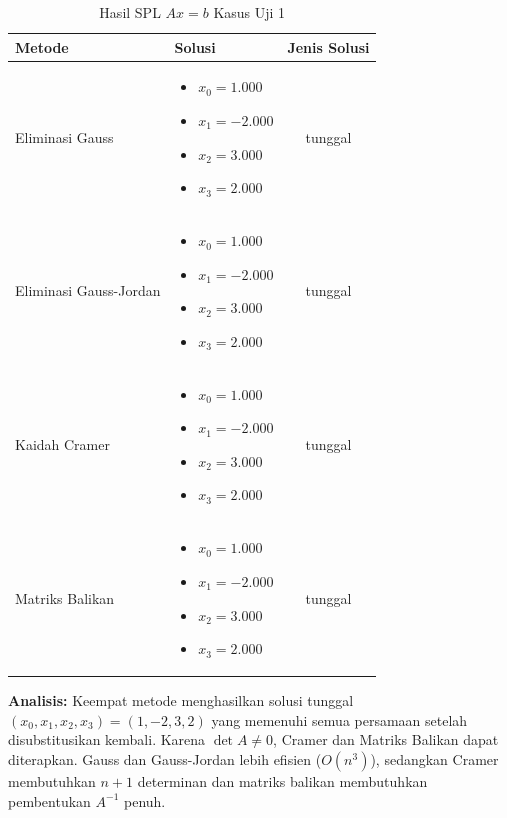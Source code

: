 \documentclass[12pt,a4paper]{report}
\begin{document}
\begin{table}[H]
    \centering
    \caption{Hasil SPL $Ax=b$ Kasus Uji 1}
    \begin{tabular}{|l|p{5cm}|c|}
        \hline
        \textbf{Metode} & \textbf{Solusi} & \textbf{Jenis Solusi} \\
        \hline
        Eliminasi Gauss & 
        \begin{itemize}
            \item $x_0 = 1.000$
            \item $x_1 = -2.000$
            \item $x_2 = 3.000$
            \item $x_3 = 2.000$
        \end{itemize} 
        & tunggal\\
        \hline
        Eliminasi Gauss-Jordan & 
        \begin{itemize}
            \item $x_0 = 1.000$
            \item $x_1 = -2.000$
            \item $x_2 = 3.000$
            \item $x_3 = 2.000$
        \end{itemize} 
        & tunggal \\
        \hline
        Kaidah Cramer & 
        \begin{itemize}
            \item $x_0 = 1.000$
            \item $x_1 = -2.000$
            \item $x_2 = 3.000$
            \item $x_3 = 2.000$
        \end{itemize} 
        & tunggal \\
        \hline
        Matriks Balikan & 
        \begin{itemize}
            \item $x_0 = 1.000$
            \item $x_1 = -2.000$
            \item $x_2 = 3.000$
            \item $x_3 = 2.000$
        \end{itemize} 
        & tunggal \\
        \hline
    \end{tabular}
\end{table}

 
\textbf{Analisis:} Keempat metode menghasilkan solusi tunggal $(x_0,x_1,x_2,x_3)=(1,-2,3,2)$ yang memenuhi semua persamaan setelah disubstitusikan kembali. Karena $\det A \neq 0$, Cramer dan Matriks Balikan dapat diterapkan. Gauss dan Gauss-Jordan lebih efisien ($O(n^3)$), sedangkan Cramer membutuhkan $n+1$ determinan dan matriks balikan membutuhkan pembentukan $A^{-1}$ penuh.
\end{document}
